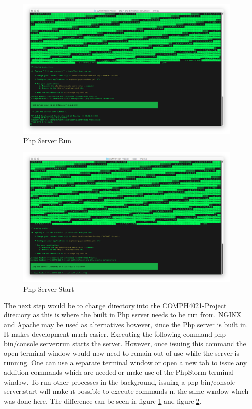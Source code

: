 \begin{figure}[htbp]
   \centering
   \includegraphics[width=400pt]{figures/php_server_run.png} %
   \caption{Php Server Run}
   \label{fig:Php Server Run}
\end{figure}

\begin{figure}[htbp]
   \centering
   \includegraphics[width=400pt]{figures/php_server_start.png} %
   \caption{Php Server Start}
   \label{fig:Php Server Start}
\end{figure}

The next step would be to change directory into the COMPH4021-Project directory as this is where the built in Php server needs to be run from. NGINX and Apache may be used as alternatives however, since the Php server is built in. It makes development much easier. Executing the following command php bin/console server:run starts the server. However, once issuing this command the open terminal window would now need to remain out of use while the server is running. One can use a separate terminal window or open a new tab to issue any addition commands which are needed or make use of the PhpStorm terminal window. To run other processes in the background, issuing a php bin/console server:start will make it possible to execute commands in the same window which was done here. The difference can be seen in figure \ref{fig:Php Server Run} and figure \ref{fig:Php Server Start}.

